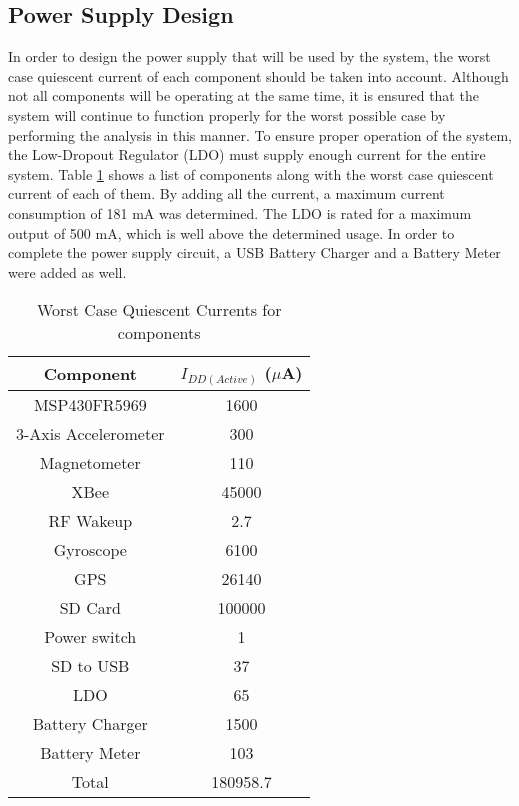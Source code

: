 \subsection{Power Supply Design}
In order to design the power supply that will be used by the system, the worst case quiescent current of each component should be taken into account.  Although not all components will be operating at the same time, it is ensured that the system will continue to function properly for the worst possible case by performing the analysis in this manner.  To ensure proper operation of the system, the Low-Dropout Regulator (LDO) must supply enough current for the entire system.  Table \ref{tab:powerSupply} shows a list of components along with the worst case quiescent current of each of them.  By adding all the current, a maximum current consumption of 181 mA was determined.  The LDO is rated for a maximum output of 500 mA, which is well above the determined usage. In order to complete the power supply circuit, a USB Battery Charger and a Battery Meter were added as well.  
\begin{table}[H]
  \centering
  \caption{Worst Case Quiescent Currents for components}
    \begin{tabular}{|c|c|}
     \hline
     \rowcolor{Gray}
    Component & $I_{DD(Active)}$ ($\mu$A) \\
     \hline \hline
    MSP430FR5969 & 1600   \\ \hline
    3-Axis Accelerometer & 300  \\ \hline
    Magnetometer & 110  \\ \hline
    XBee  & 45000 \\ \hline
    RF Wakeup & 2.7   \\ \hline
    Gyroscope & 6100  \\ \hline
    GPS   & 26140 \\ \hline
    SD Card & 100000  \\ \hline
    Power switch & 1  \\ \hline
    SD to USB & 37   \\ \hline
    LDO   & 65  \\ \hline
    Battery Charger & 1500  \\ \hline
    Battery Meter & 103   \\ \hline \hline
    Total & 180958.7  \\ \hline     
    \end{tabular}%
  \label{tab:powerSupply}%
\end{table}%

